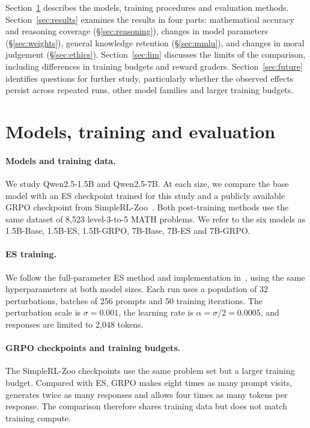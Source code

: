 \documentclass[10pt]{article}
\begin{document}
Section~\ref{sec:setup} describes the models, training procedures and evaluation methods. Section~\ref{sec:results} examines the results in four parts: mathematical accuracy and reasoning coverage (\S\ref{sec:reasoning}), changes in model parameters (\S\ref{sec:weights}), general knowledge retention (\S\ref{sec:mmlu}), and changes in moral judgement (\S\ref{sec:ethics}). Section~\ref{sec:lim} discusses the limits of the comparison, including differences in training budgets and reward graders. Section~\ref{sec:future} identifies questions for further study, particularly whether the observed effects persist across repeated runs, other model families and larger training budgets.

\section{Models, training and evaluation}\label{sec:setup}
\paragraph{Models and training data.} We study Qwen2.5-1.5B and Qwen2.5-7B. At each size, we compare the base model with an ES checkpoint trained for this study and a publicly available GRPO checkpoint from SimpleRL-Zoo~\cite{simplerl}. Both post-training methods use the same dataset of 8,523 level-3-to-5 MATH problems. We refer to the six models as 1.5B-Base, 1.5B-ES, 1.5B-GRPO, 7B-Base, 7B-ES and 7B-GRPO.

\paragraph{ES training.} We follow the full-parameter ES method and implementation in~\cite{qiu}, using the same hyperparameters at both model sizes. Each run uses a population of 32 perturbations, batches of 256 prompts and 50 training iterations. The perturbation scale is $\sigma = 0.001$, the learning rate is $\alpha = \sigma/2 = 0.0005$, and responses are limited to 2,048 tokens.

\paragraph{GRPO checkpoints and training budgets.} The SimpleRL-Zoo checkpoints use the same problem set but a larger training budget. Compared with ES, GRPO makes eight times as many prompt visits, generates twice as many responses and allows four times as many tokens per response. The comparison therefore shares training data but does not match training compute.
\end{document}
